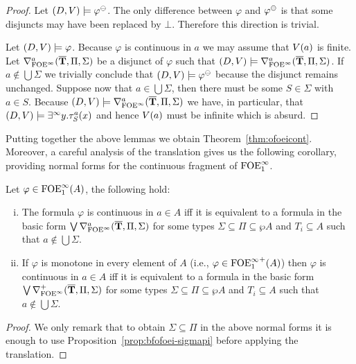 \begin{proof}
\bigskip
\noindent\fbox{$\Leftarrow$} Let $(D,\val) \models \varphi^\tcont$. The only difference between $\varphi$ and $\varphi^\tcont$ is that some disjuncts may have been replaced by $\bot$. Therefore this direction is trivial.

\bigskip
\noindent\fbox{$\Rightarrow$} Let $(D,\val) \models \varphi$. Because $\varphi$ is continuous in $a$ we may assume that $\val(a)$ is finite. Let $\mondbnfofoei{\vlist{T}}{\Pi}{\Sigma}{a}$ be a disjunct of $\varphi$ such that $(D,\val) \models \mondbnfofoei{\vlist{T}}{\Pi}{\Sigma}{a}$. If $a \notin \bigcup\Sigma$ we trivially conclude that $(D,\val) \models \varphi^\tcont$ because the disjunct remains unchanged. Suppose now that $a\in \bigcup\Sigma$, then there must be some $S\in\Sigma$ with $a\in S$. Because $(D,\val) \models \mondbnfofoei{\vlist{T}}{\Pi}{\Sigma}{a}$ we have, in particular, that $(D,\val) \models \qu y.\tau^a_S(x)$ and hence $\val(a)$ must be infinite which is absurd.
\end{proof}

Putting together the above lemmas we obtain Theorem~\ref{thm:ofoeicont}. Moreover, a careful analysis of the translation gives us the following corollary, providing normal forms for the continuous fragment of $\ofoei$.

\begin{corollary}\label{cor:ofoeicontinuousnf}
Let $\varphi \in \ofoei(A)$, the following hold:
	\begin{enumerate}[(i)]
		\item The formula $\varphi$ is continuous in $a \in A$ iff it is equivalent to a formula in the basic form $\bigvee \mondbnfofoei{\vlist{T}}{\Pi}{\Sigma}{a}$ for some types $\Sigma\subseteq\Pi \subseteq \wp A$ and $T_i \subseteq A$ such that $a\notin \bigcup\Sigma$.
		\item If $\varphi$ is monotone in every element of $A$ (i.e., $\varphi\in{\ofoei}^+(A)$) then $\varphi$ is continuous in $a \in A$ iff it is equivalent to a formula in the basic form $\bigvee \posdbnfofoei{\vlist{T}}{\Pi}{\Sigma}$ for some types $\Sigma\subseteq\Pi \subseteq \wp A$ and $T_i \subseteq A$ such that $a\notin \bigcup\Sigma$.
	\end{enumerate}
\end{corollary}
\begin{proof}
	We only remark that to obtain $\Sigma\subseteq\Pi$ in the above normal forms it is enough to use Proposition~\ref{prop:bfofoei-sigmapi} before applying the translation.
\end{proof}
